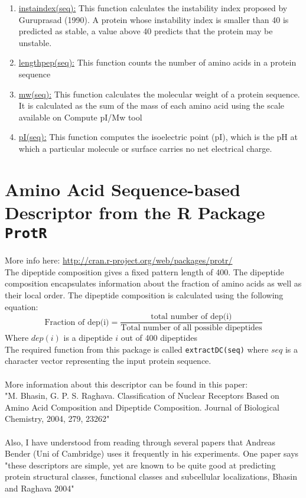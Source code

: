 \documentclass[a4paper,12pt, english]{article}
\begin{document}
\begin{enumerate}
{"Rao","Rose","Roseman","Sweet","Tanford","Welling","Wilson","Wolfenden"or"Zimmerman"}\\Example: hydrophobicity("QWGRRCCGWGPGRRYCVRWC","Aboderin") or hydrophobicity("QWGRRCCGWGPGRRYCVRWC","AbrahamLeo")
	\item \underline{instaindex(seq):} This function calculates the instability index proposed by Guruprasad (1990). A protein whose instability index is smaller than 40 is predicted as stable, a value above 40 predicts that the protein may be unstable.
	\item \underline{lengthpep(seq):} This function counts the number of amino acids in a protein sequence
	\item \underline{mw(seq):} This function calculates the molecular weight of a protein sequence. It is calculated as the sum of the mass of each amino acid using the scale available on Compute pI/Mw tool
	\item \underline{pI(seq):} This function computes the isoelectric point (pI), which is the pH at which a particular molecule or surface carries no net electrical charge.
\end{enumerate} 




\section{Amino Acid Sequence-based Descriptor from the R Package \texttt{ProtR}}
More info here: \url{http://cran.r-project.org/web/packages/protr/}\\
The dipeptide composition gives a fixed pattern length of 400. The dipeptide composition encapsulates information about the fraction of amino acids as well as their local order. The dipeptide composition is calculated using the following equation:
\begin{equation} \mbox{Fraction of dep(i)}=\frac{\mbox{total number of dep(i)}}{\mbox{Total number of all possible dipeptides}}\end{equation} 
Where $dep(i)$ is a dipeptide $i$ out of 400 dipeptides\\
The required function from this package is called \texttt{extractDC(seq)} where $seq$ is a character vector representing the input protein sequence.\\ \\
More information about this descriptor can be found in this paper:\\
"M. Bhasin, G. P. S. Raghava. Classification of Nuclear Receptors Based on Amino Acid Composition and Dipeptide Composition. Journal of Biological Chemistry, 2004, 279, 23262"\\ \\
Also, I have understood from reading through several papers that Andreas Bender (Uni of Cambridge) uses it frequently in his experiments. One paper says "these descriptors are simple, yet are known to be quite good at predicting protein structural classes, functional classes and subcellular localizations, Bhasin and Raghava 2004"
\end{document}
